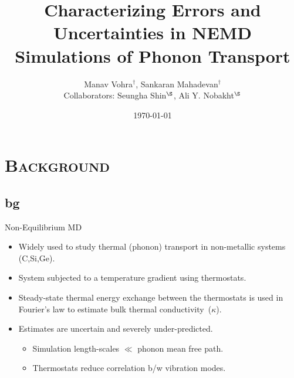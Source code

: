\documentclass[xcolor={x11names,table},compress,svgnames,mathserif]{beamer}
\title[UQ: Nano-scale Phonon Heat Transfer]{\textbf{Characterizing Errors and Uncertainties in
NEMD Simulations of Phonon Transport}}
\author[M. Vohra and S. Mahadevan]{Manav Vohra$^{\dag}$, Sankaran Mahadevan$^{\dag}$ \\ \vspace{2mm}
\scriptsize{Collaborators: Seungha Shin$^{\S}$, Ali Y. Nobakht$^{\S}$}}
\institute{$^{\dag}$Vanderbilt University\\ \vspace{1mm}
$^{\S}$University of Tennessee, Knoxville}
\date{\today}
\renewcommand{\(}{\begin{columns}}
\renewcommand{\)}{\end{columns}}
\newcommand{\<}[1]{\begin{column}{#1}}
\renewcommand{\>}{\end{column}}
\newcommand*\myitem{%
  \item[\color{DeepSkyBlue4}\scalebox{0.6}{\ding{110}}]}
\begin{document}
{

\begin{frame}[noframenumbering]

\titlepage
\vspace{-21mm}
\centering



\end{frame}
}


\section{\scshape Background}
\subsection{bg}

\begin{frame}{Non-Equilibrium MD}

\begin{itemize}

\myitem Widely used to study thermal (phonon) transport in 
{\color{pigment}non-metallic} systems (C,Si,Ge).
\vspace{2mm}
\myitem System subjected to a temperature gradient using thermostats.
\vspace{2mm}
\myitem {\color{pigment}Steady-state} thermal energy exchange between
the thermostats is used in Fourier's law to estimate bulk thermal
conductivity~($\kappa$). \vspace{2mm}
\myitem Estimates are {\color{pigment}uncertain} and severely
{\color{pigment}under-predicted}.
\begin{itemize}
  \item Simulation length-scales $\ll$ phonon mean free path. \vspace{1mm}
  \item Thermostats reduce correlation b/w vibration modes.
\end{itemize}

\end{itemize}

\end{frame}
\end{document}
